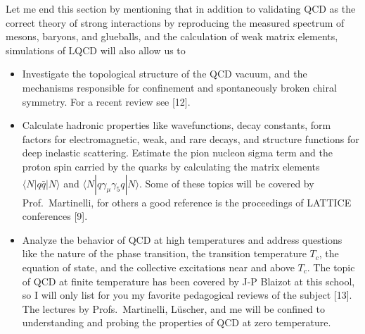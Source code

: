 Let me end this section by mentioning that in addition to validating QCD as
the correct theory of strong interactions by reproducing the measured
spectrum of mesons, baryons, and glueballs, and the calculation of weak
matrix elements, simulations of LQCD will also allow us to
\begin{itemize}
\item Investigate the topological structure of the QCD vacuum, and the
mechanisms responsible for confinement and spontaneously broken chiral
symmetry. For a recent review see [12].
\item Calculate hadronic properties like wavefunctions, decay constants,
form factors for electromagnetic, weak, and rare decays, and structure
functions for deep inelastic scattering. Estimate the pion nucleon sigma
term and the proton spin carried by the quarks by calculating the matrix
elements $\langle N | q\bar{q} | N \rangle$ and
$\langle N | q\gamma_\mu \gamma_5 q | N \rangle$. Some of these topics
will be covered by Prof.~Martinelli, for others a good reference is the
proceedings of LATTICE conferences [9].
\item Analyze the behavior of QCD at high temperatures and address questions
like the nature of the phase transition, the transition temperature $T_c$,
the equation of state, and the collective excitations near and above $T_c$.
The topic of QCD at finite temperature has been covered by J-P Blaizot at
this school, so I will only list for you my favorite pedagogical reviews of
the subject [13]. The lectures by Profs.~Martinelli, L\"{u}scher, and me
will be confined to understanding and probing the properties of QCD at zero
temperature.
\end{itemize}
